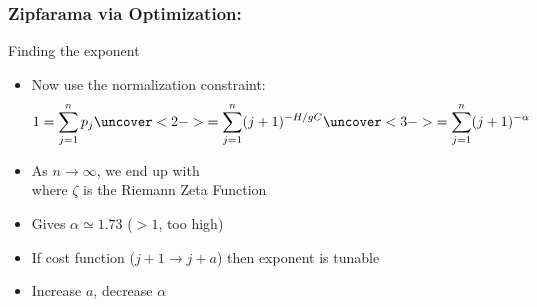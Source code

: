 

\begin{frame}
  \frametitle{Zipfarama via Optimization:}

  \begin{block}{Finding the exponent}
  \begin{itemize}
  \item<1-> Now use the normalization constraint:
    $$ 
    1 = \sum_{j=1}^n p_j
    \uncover<2->{
      = \sum_{j=1}^n (j+1)^{-H/gC}
    }
    \uncover<3->{
      = \sum_{j=1}^n (j+1)^{-\alpha}
    }
    $$
  \item<4-> As $n \rightarrow \infty$, we end up with \\
    where $\zeta$ is the Riemann Zeta Function
  \item<5-> Gives $\alpha \simeq 1.73$ ($> 1$, too high)
  \item<6-> If cost function  ($j+1 \rightarrow j+a$)
    then exponent is tunable
  \item<7-> Increase $a$, decrease $\alpha$
  \end{itemize}
\end{block}
  
\end{frame}


